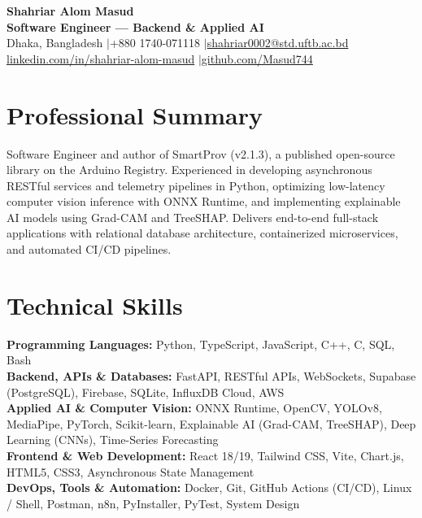 \documentclass[10pt,a4paper]{article}
\begin{document}
\pagestyle{empty}

\begin{center}
    {\LARGE \textbf{Shahriar Alom Masud}} \\
    \vspace{2pt}
    \textbf{Software Engineer --- Backend \& Applied AI} \\
    \vspace{2pt}
    \small
    Dhaka, Bangladesh \enspace$|$\enspace +880 1740-071118 \enspace$|$\enspace \href{mailto:shahriar0002@std.uftb.ac.bd}{shahriar0002@std.uftb.ac.bd} \\
    \href{https://www.linkedin.com/in/shahriar-alom-masud}{linkedin.com/in/shahriar-alom-masud} \enspace$|$\enspace \href{https://github.com/Masud744}{github.com/Masud744}
\end{center}
\vspace{-4pt}

\section*{Professional Summary}
Software Engineer and author of SmartProv (v2.1.3), a published open-source library on the Arduino Registry. Experienced in developing asynchronous RESTful services and telemetry pipelines in Python, optimizing low-latency computer vision inference with ONNX Runtime, and implementing explainable AI models using Grad-CAM and TreeSHAP. Delivers end-to-end full-stack applications with relational database architecture, containerized microservices, and automated CI/CD pipelines.

\section*{Technical Skills}
\textbf{Programming Languages:} Python, TypeScript, JavaScript, C++, C, SQL, Bash \\
\textbf{Backend, APIs \& Databases:} FastAPI, RESTful APIs, WebSockets, Supabase (PostgreSQL), Firebase, SQLite, InfluxDB Cloud, AWS \\
\textbf{Applied AI \& Computer Vision:} ONNX Runtime, OpenCV, YOLOv8, MediaPipe, PyTorch, Scikit-learn, Explainable AI (Grad-CAM, TreeSHAP), Deep Learning (CNNs), Time-Series Forecasting \\
\textbf{Frontend \& Web Development:} React 18/19, Tailwind CSS, Vite, Chart.js, HTML5, CSS3, Asynchronous State Management \\
\textbf{DevOps, Tools \& Automation:} Docker, Git, GitHub Actions (CI/CD), Linux / Shell, Postman, n8n, PyInstaller, PyTest, System Design
\end{document}
